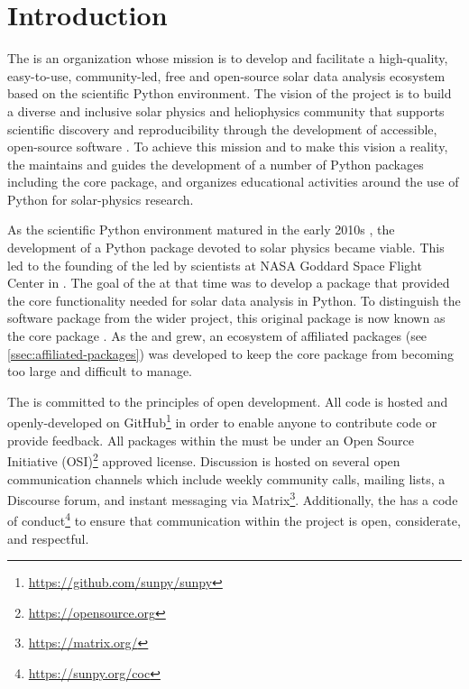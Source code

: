 \section{Introduction}
\label{sec:introduction}

The \sunpyproj is an organization whose mission is to develop and facilitate a high-quality, easy-to-use, community-led, free and open-source solar data analysis ecosystem based on the scientific Python environment.
The vision of the project is to build a diverse and inclusive solar physics and heliophysics community that supports scientific discovery and  reproducibility through the development of accessible, open-source software \citep{bobra_monica_2020_7020094}.
To achieve this mission and to make this vision a reality, the \sunpyproj maintains and guides the development of a number of Python packages including the \sunpypkg core package, and organizes educational activities around the use of Python for solar-physics research.

As the scientific Python environment matured in the early 2010s \citep{Hunter:2007, harris2020array, 2020SciPy-NMeth}, the development of a Python package devoted to solar physics became viable.
This led to the founding of the \sunpyproj led by scientists at NASA Goddard Space Flight Center in .
The goal of the \sunpyproj at that time was to develop a package that provided the core functionality needed for solar data analysis in Python.
To distinguish the software package from the wider project, this original package is now known as the \sunpypkg core package \citep{sunpy_community2020}.
As the \sunpyproj and \sunpypkg grew, an ecosystem of affiliated packages (see \autoref{ssec:affiliated-packages}) was developed to keep the \sunpypkg core package from becoming too large and difficult to manage.

The \sunpyproj is committed to the principles of open development.
All code is hosted and openly-developed on GitHub\footnote{\url{https://github.com/sunpy/sunpy}} in order to enable anyone to contribute code or provide feedback.
All packages within the \sunpyproj must be under an Open Source Initiative (OSI)\footnote{\url{https://opensource.org}} approved license.
Discussion is hosted on several open communication channels which include weekly community calls, mailing lists, a Discourse forum, and instant messaging via Matrix\footnote{\url{https://matrix.org/}}.
Additionally, the \sunpyproj has a code of conduct\footnote{\url{https://sunpy.org/coc}} to ensure that communication within the project is open, considerate, and respectful.

